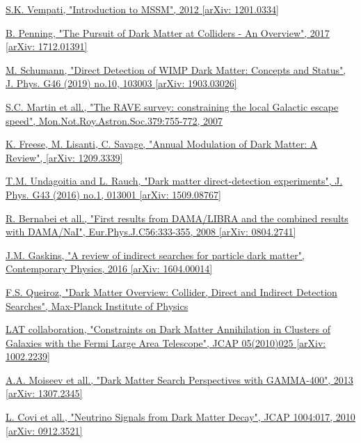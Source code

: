 \documentclass[a4paper, 10pt, openright]{report}
\begin{document}
\begin{thebibliography}{1}
\href{https://arxiv.org/abs/1201.0334}{S.K. Vempati,
"Introduction to MSSM",
2012 [arXiv: 1201.0334]}

\href{https://arxiv.org/abs/1712.01391}{B. Penning,
"The Pursuit of Dark Matter at Colliders - An Overview",
2017 [arXiv: 1712.01391]
}

\href{https://arxiv.org/abs/1903.03026}{M. Schumann,
"Direct Detection of WIMP Dark Matter: Concepts and Status",
J. Phys. G46 (2019) no.10, 103003 [arXiv: 1903.03026]
}

\href{https://arxiv.org/abs/astro-ph/0611671}{S.C. Martin et all.,
"The RAVE survey: constraining the local Galactic escape speed",
Mon.Not.Roy.Astron.Soc.379:755-772, 2007
}

\href{https://arxiv.org/abs/1209.3339}{K. Freese, M. Lisanti, C. Savage,
"Annual Modulation of Dark Matter: A Review",
[arXiv: 1209.3339]
}

\href{https://arxiv.org/abs/1509.08767}{T.M. Undagoitia and L. Rauch,
"Dark matter direct-detection experiments",
J. Phys. G43 (2016) no.1, 013001 [arXiv: 1509.08767]
}

\href{https://arxiv.org/abs/0804.2741}{R. Bernabei et all.,
"First results from DAMA/LIBRA and the combined results with DAMA/NaI",
Eur.Phys.J.C56:333-355, 2008 [arXiv: 0804.2741]
}

\href{https://arxiv.org/pdf/1604.00014}{J.M. Gaskins,
"A review of indirect searches for particle dark matter",
Contemporary Physics, 2016 [arXiv: 1604.00014]
}

\href{http://inspirehep.net/record/1466249/files/1589812_427-436.pdf}{F.S. Queiroz,
"Dark Matter Overview: Collider, Direct and Indirect Detection Searches",
Max-Planck Institute of Physics
}

\href{https://arxiv.org/pdf/1106.3416.pdf}{LAT collaboration,
"Constraints on Dark Matter Annihilation in Clusters of Galaxies with the Fermi Large Area Telescope",
JCAP 05(2010)025 [arXiv: 1002.2239]
}

\href{https://arxiv.org/abs/1307.2345}{A.A. Moiseev et all.,
"Dark Matter Search Perspectives with GAMMA-400",
2013 [arXiv: 1307.2345]
}

\href{https://arxiv.org/abs/0912.3521}{L. Covi et all.,
"Neutrino Signals from Dark Matter Decay",
JCAP 1004:017, 2010 [arXiv: 0912.3521]
}


\end{thebibliography}
\end{document}
